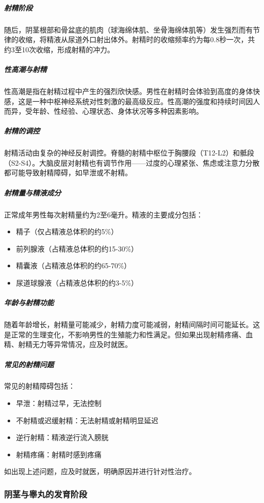 \documentclass[12pt,a4paper,twoside]{ctexbook}
\begin{document}
\subparagraph{射精阶段}

随后，阴茎根部和骨盆底的肌肉（球海绵体肌、坐骨海绵体肌等）发生强烈而有节律的收缩，将精液从尿道外口射出体外。射精时的收缩频率约为每0.8秒一次，共约3至10次收缩，形成射精的冲力。

\subparagraph{性高潮与射精}

性高潮是指在射精过程中产生的强烈欣快感。男性在射精时会体验到高度的身体快感，这是一种中枢神经系统对性刺激的最高级反应。性高潮的强度和持续时间因人而异，受年龄、性经验、心理状态、身体状况等多种因素影响。

\subparagraph{射精的调控}

射精活动由复杂的神经反射调控。脊髓的射精中枢位于胸腰段（T12-L2）和骶段（S2-S4）。大脑皮层对射精也有调节作用——过度的心理紧张、焦虑或注意力分散都可能导致射精障碍，如早泄或不射精。

\subparagraph{射精量与精液成分}

正常成年男性每次射精量约为2至6毫升。精液的主要成分包括：
\begin{itemize}
    \item 精子（仅占精液总体积的约5\%）
    \item 前列腺液（占精液总体积的约15-30\%）
    \item 精囊液（占精液总体积的约65-70\%）
    \item 尿道球腺液（占精液总体积的约3-5\%）
\end{itemize}

\subparagraph{年龄与射精功能}

随着年龄增长，射精量可能减少，射精力度可能减弱，射精间隔时间可能延长。这是正常的生理变化，不影响男性的生殖能力和性满足。但如果出现射精疼痛、血精、射精无力等异常情况，应及时就医。

\subparagraph{常见的射精问题}

常见的射精障碍包括：
\begin{itemize}
    \item 早泄：射精过早，无法控制
    \item 不射精或迟缓射精：无法射精或射精明显延迟
    \item 逆行射精：精液逆行流入膀胱
    \item 射精疼痛：射精时感到疼痛
\end{itemize}
如出现上述问题，应及时就医，明确原因并进行针对性治疗。

\subsubsection{阴茎与睾丸的发育阶段}
\end{document}
